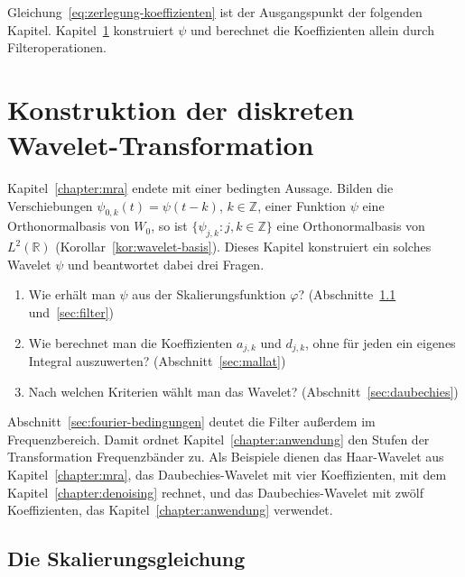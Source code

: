 \documentclass[a4paper,11pt,bibliography=totoc,listof=totoc,headinclude=true,cleardoublepage=empty,oneside]{scrbook}
\theoremstyle{plain}
\theoremstyle{definition}
\newcommand{\R}{\mathbb{R}}
\newcommand{\Z}{\mathbb{Z}}
\newcommand{\LZwei}{L^2(\R)}
\begin{document}
Gleichung~\eqref{eq:zerlegung-koeffizienten} ist der Ausgangspunkt der
folgenden Kapitel. Kapitel~\ref{chapter:dwt} konstruiert $\psi$ und berechnet
die Koeffizienten allein durch Filteroperationen.

\chapter{Konstruktion der diskreten Wavelet-Transformation}
\label{chapter:dwt}

Kapitel~\ref{chapter:mra} endete mit einer bedingten Aussage. Bilden die
Verschiebungen $\psi_{0,k}(t) = \psi(t-k)$, $k\in\Z$, einer Funktion $\psi$
eine Orthonormalbasis von $W_0$, so ist $\{\psi_{j,k} : j,k\in\Z\}$ eine
Orthonormalbasis von $\LZwei$ (Korollar~\ref{kor:wavelet-basis}). Dieses
Kapitel konstruiert ein solches Wavelet $\psi$ und beantwortet dabei drei
Fragen.
\begin{enumerate}
\item Wie erhält man $\psi$ aus der Skalierungsfunktion $\varphi$?
  (Abschnitte~\ref{sec:skalierungsgleichung} und~\ref{sec:filter})
\item Wie berechnet man die Koeffizienten $a_{j,k}$ und $d_{j,k}$, ohne für
  jeden ein eigenes Integral auszuwerten? (Abschnitt~\ref{sec:mallat})
\item Nach welchen Kriterien wählt man das Wavelet?
  (Abschnitt~\ref{sec:daubechies})
\end{enumerate}
Abschnitt~\ref{sec:fourier-bedingungen} deutet die Filter au\ss{}erdem im
Frequenzbereich. Damit ordnet Kapitel~\ref{chapter:anwendung} den Stufen der
Transformation Frequenzbänder zu. Als Beispiele dienen das Haar-Wavelet aus
Kapitel~\ref{chapter:mra}, das Daubechies-Wavelet mit vier Koeffizienten, mit
dem Kapitel~\ref{chapter:denoising} rechnet, und das Daubechies-Wavelet mit
zwölf Koeffizienten, das Kapitel~\ref{chapter:anwendung} verwendet.

\section{Die Skalierungsgleichung}
\label{sec:skalierungsgleichung}
\end{document}
